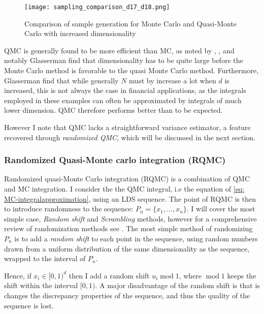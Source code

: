 \documentclass[11pt]{article}
\begin{document}
\begin{figure}[h!]
  \begin{center}
  \caption{Comparison of sample generation for Monte Carlo and Quasi-Monte Carlo with increased dimensionality} 
  \label{fig: Sampling_comparison_MC_D17D18}
  \texttt{[image: sampling\_comparison\_d17\_d18.png]}
  \end{center}
\end{figure}
QMC is generally found to be more efficient than MC, as noted by \autocite{Glasserman2004MC}, \autocite{Judd1998Book},
and notably Glasserman find that dimensionality has to be quite large before the Monte Carlo method is favorable to the quasi Monte Carlo method.
Furthermore, Glasserman find that while generally $N$ must by increase a lot when $d$ is increased, this is not
always the case in financial applications, as the integrals employed in these examples can often
be approximated by integrals of much lower dimension. QMC therefore performs better than to be expected.

However I note that \ac{QMC} lacks a straightforward variance estimator,
a feature recovered through \textit{randomized QMC}, which will be discussed in the next section.

\subsubsection{Randomized Quasi-Monte carlo integration (RQMC)} \label{Subsection: RQMC}
Randomized quasi-Monte Carlo integration (RQMC) is a combination of \ac{QMC} and \ac{MC} integration.
I consider the the QMC integral, i.e the equation of \eqref{eq: MC-integralapproximation}, using an \ac{LDS} sequence.
The point of \ac{RQMC} is then to introduce randomness to the sequence: $P_{n} = \{ x_1 , \ldots , x_n \}$.
I will cover the most simple case, \textit{Random shift} and \textit{Scrambling} methods, however for a comprehensive review of randomization methods see \textcite{Glasserman2004MC}.
The most simple method of randomizing $P_n$ is to add a \textit{random shift} to each point in the sequence, using
random numbers drawn from a uniform distribution of the same dimensionality as the sequence, wrapped to the interval of $P_n$.

Hence, if $x_{i} \in [0,1)^{d}$ then I add a random shift $u_{i} \operatorname{mod} 1$, where
$\operatorname{mod} 1$ keeps the shift within the interval $[0,1)$. 
A major disadvantage of the random shift is that is changes the discrepancy properties of the sequence,
and thus the quality of the sequence is lost.
\end{document}
